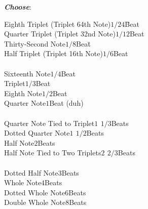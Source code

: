 \documentclass{article}
\newcommand\myfrac[2]{#1/#2}
\begin{document}
\begin{description}
		\begin{description}
			\item{\bf \textit{Choose}}:
			\begin{tabbing}
			Eighth Triplet (Triplet 64th Note)\hspace{3em}\=\(\myfrac{1}{24}\)\hspace{1em}\=Beat\\
			Quarter Triplet (Triplet 32nd Note)\>\(\myfrac{1}{12}\)\>Beat\\
			Thirty-Second Note\>\(\myfrac{1}{8}\)\>Beat\hspace{0.7in}\=\\
			Half Triplet (Triplet 16th Note)\>\(\myfrac{1}{6}\)\>Beat\\
			\\
			Sixteenth Note\>\(\myfrac{1}{4}\)\>Beat\\
			Triplet\>\(\myfrac{1}{3}\)\>Beat\\
			Eighth Note\>\(\myfrac{1}{2}\)\>Beat\>\\
			Quarter Note\>\(1\)\>Beat (duh)\\
			\\
			Quarter Note Tied to Triplet\>\(1\ \, \myfrac{1}{3}\)\>Beats\\
			Dotted Quarter Note\>\(1\ \, \myfrac{1}{2}\)\>Beats\\
			Half Note\>\(2\)\>Beats\>\\
			Half Note Tied to Two Triplets\>\(2\ \, \myfrac{2}{3}\)\>Beats\\
			\\
			Dotted Half Note\>\(3\)\>Beats\\
			Whole Note\>\(4\)\>Beats\\
			Dotted Whole Note\>\(6\)\>Beats\>\\
			Double Whole Note\>\(8\)\>Beats
			\end{tabbing}
		\end{description}


\end{description}
\end{document}

